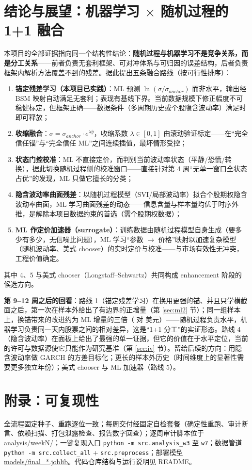 \documentclass[11pt]{ctexart}
\begin{document}
\section{结论与展望：机器学习 $\times$ 随机过程的 1+1 融合}
本项目的全部证据指向同一个结构性结论：\textbf{随机过程与机器学习不是竞争关系，而是分工关系}——前者负责无套利框架、可对冲体系与可归因的误差结构，后者负责框架内解析方法覆盖不到的残差。据此提出五条融合路线（按可行性排序）：
\begin{enumerate}
  \item \textbf{锚定残差学习（本项目已实践）}：ML 预测 $\ln(\sigma/\sigma_{anchor})$ 而非水平，输出经 BSM 映射自动满足无套利；表现有基线下界。当前数据规模下修正幅度不可稳健标定，但框架正确——数据条件（多周期历史或个股隐含波动率）满足时即可释放；
  \item \textbf{收缩融合}：$\sigma = \sigma_{anchor}\cdot e^{\lambda \hat y}$，收缩系数 $\lambda\in[0,1]$ 由滚动验证标定——在“完全信任锚”与“完全信任 ML”之间连续插值，最坏情形受控；
  \item \textbf{状态门控校准}：ML 不直接定价，而判别当前波动率状态（平静/恐慌/转换），据此切换随机过程侧的校准窗口——直接针对第 4 周“无单一窗口全状态占优”的发现，ML 只做它擅长的分类；
  \item \textbf{隐含波动率曲面残差}：以随机过程模型（SVI/局部波动率）拟合个股期权隐含波动率曲面，ML 学习曲面残差的动态——信息含量与样本量均优于时序外推，是解除本项目数据约束的首选（需个股期权数据）；
  \item \textbf{ML 作定价加速器（surrogate）}：训练数据由随机过程模型自身生成（要多少有多少，无信噪比问题），ML 学习“参数 $\to$ 价格”映射以加速复杂模型（随机波动率、美式 chooser）的实时定价与校准——与市场有效性无冲突，工程价值确定。
\end{enumerate}
其中 4、5 与美式 chooser（Longstaff--Schwartz）共同构成 enhancement 阶段的候选方向。

\textbf{第 9--12 周之后的回看}：路线 1（锚定残差学习）在换用更强的锚、并且只学横截面之后，第一次在样本外给出了有边界的正增量（第 \ref{sec:ml2} 节）；同一组样本上，换锚带来的改进约为 ML 增量的三倍（\rnHOneDelta{} 对 \rnHTwoDelta{} 美元）——随机过程负责水平，机器学习负责同一天内股票之间的相对差异，这是“1+1 分工”的实证形态。路线 4（隐含波动率）在面板上给出了最强的单一证据，但它的价值在于水平定位，当前的许可与数据源使它只能作为研究基准（第 \ref{sec:iv} 节）。留给后续的方向：用隐含波动率做 GARCH 的方差目标化；更长的样本外历史（时间维度上的显著性需要更多独立年份）；美式 chooser 与 ML 加速器（路线 5）。

\section*{附录：可复现性}
全流程固定种子、重跑逐位一致；每周交付经固定自检套餐（确定性重跑、审计断言、依赖扫描、打包泄露检查、报告数字回查）；逐周审计脚本位于 \url{analysis/weekN/}；一键复现入口 \texttt{python -m src.analysis\_w3} 至 \texttt{w7}；数据管道 \texttt{python -m src.collect\_all} + \texttt{src.preprocess}；部署模型 \url{models/final_*.joblib}。代码仓库结构与运行说明见 README。
\end{document}
